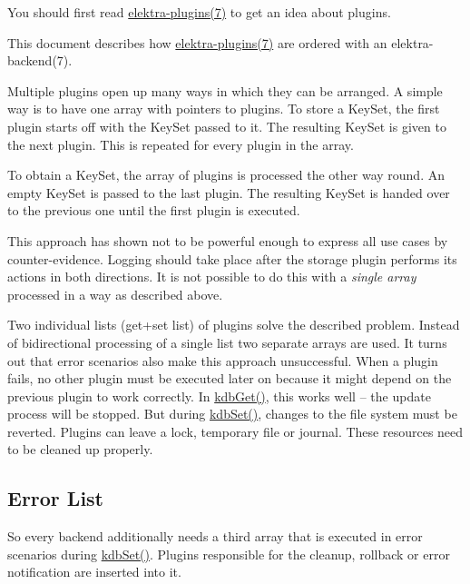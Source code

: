 You should first read \hyperlink{md_src_plugins_README_src_plugins_README_md}{elektra-\/plugins(7)} to get an idea about plugins.

This document describes how \hyperlink{md_src_plugins_README_src_plugins_README_md}{elektra-\/plugins(7)} are ordered with an elektra-\/backend(7).

Multiple plugins open up many ways in which they can be arranged. A simple way is to have one array with pointers to plugins. To store a {\ttfamily Key\+Set}, the first plugin starts off with the {\ttfamily Key\+Set} passed to it. The resulting {\ttfamily Key\+Set} is given to the next plugin. This is repeated for every plugin in the array.

To obtain a {\ttfamily Key\+Set}, the array of plugins is processed the other way round. An empty {\ttfamily Key\+Set} is passed to the last plugin. The resulting {\ttfamily Key\+Set} is handed over to the previous one until the first plugin is executed.

This approach has shown not to be powerful enough to express all use cases by counter-\/evidence. Logging should take place after the storage plugin performs its actions in both directions. It is not possible to do this with a {\itshape single array} processed in a way as described above.

Two individual lists (get+set list) of plugins solve the described problem. Instead of bidirectional processing of a single list two separate arrays are used. It turns out that error scenarios also make this approach unsuccessful. When a plugin fails, no other plugin must be executed later on because it might depend on the previous plugin to work correctly. In {\ttfamily \hyperlink{group__kdb_ga28e385fd9cb7ccfe0b2f1ed2f62453a1}{kdb\+Get()}}, this works well -- the update process will be stopped. But during {\ttfamily \hyperlink{group__kdb_ga11436b058408f83d303ca5e996832bcf}{kdb\+Set()}}, changes to the file system must be reverted. Plugins can leave a lock, temporary file or journal. These resources need to be cleaned up properly.

\subsection*{Error List}

So every backend additionally needs a third array that is executed in error scenarios during {\ttfamily \hyperlink{group__kdb_ga11436b058408f83d303ca5e996832bcf}{kdb\+Set()}}. Plugins responsible for the cleanup, rollback or error notification are inserted into it.

